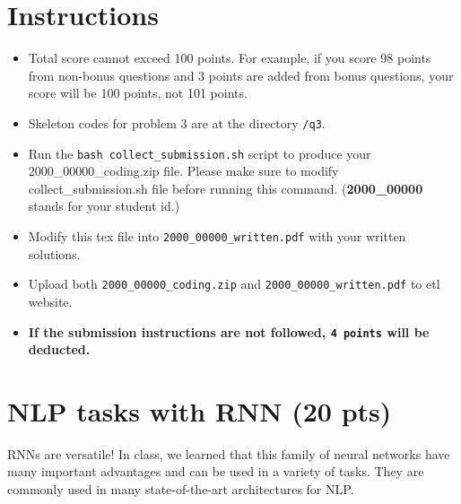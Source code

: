 \documentclass{assignment format}
\begin{document}
\begin{center}

\end{center}

\section{Instructions}
\begin{itemize}
\item Total score cannot exceed 100 points. For example, if you score 98 points from non-bonus questions and 3 points are added from bonus questions, your score will be 100 points, not 101 points.
\item Skeleton codes for problem 3 are at the directory \texttt{/q3}. 
\item Run the \texttt{bash collect\_submission.sh} script to produce your 2000\_00000\_coding.zip file. Please make sure to modify collect\_submission.sh file before running this command. (\textbf{2000\_00000} stands for your student id.)
\item Modify this tex file into \texttt{2000\_00000\_written.pdf} with your written solutions.
\item Upload both \texttt{2000\_00000\_coding.zip} and \texttt{2000\_00000\_written.pdf} to etl website.
\item \textbf{If the submission instructions are not followed, \texttt{4 points} will be deducted.}
\end{itemize}

\section{NLP tasks with RNN (20 pts)}
RNNs are versatile! In class, we learned that this family of neural networks have many important advantages and can be used in a variety of tasks. They are commonly used in many state-of-the-art architectures for NLP.
\end{document}

